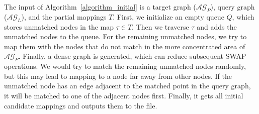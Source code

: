 \documentclass[runningheads]{llncs}
\begin{document}
	The input of Algorithm~\ref{algorithm_initial} is a target graph ($\mathcal{AG}_{P}$), query graph ($\mathcal{AG}_{L}$), and the partial mappings $T$. First, we initialize an empty queue $Q$,  which stores unmatched nodes in the map $\tau \in T$.
	Then we traverse $\tau$ and adds the unmatched nodes to the queue.  For the remaining unmatched nodes, we try to map them with the nodes that do not match in the more concentrated area of $\mathcal{AG}_{P}$. Finally, a dense graph is generated, which can reduce subsequent SWAP operations. We would try to match the remaining unmatched nodes randomly, but this may lead to mapping to a node far away from other nodes. If the unmatched node has an edge adjacent to the matched point in the query graph, it will be matched to one of the adjacent nodes first.  Finally, it gets all initial candidate mappings and outputs them to the file.
\end{document}
